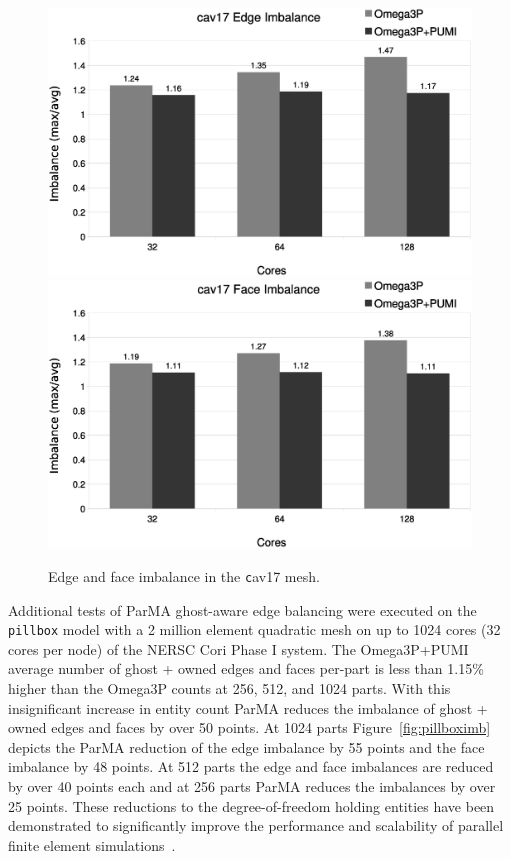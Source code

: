 \documentclass[review,12pt]{elsarticle_summary_report}
\begin{document}
\begin{figure}[ht]
\centering
  \includegraphics[width=\textwidth]{cav17-edge-imb.eps} \\
  \includegraphics[width=\textwidth]{cav17-face-imb.eps} \\
  \caption{\label{fig:cav17imb} Edge and face imbalance in the {\texttt cav17} mesh.}
\end{figure}

Additional tests of ParMA ghost-aware edge balancing were executed on the
\texttt{pillbox} model with a 2 million element quadratic mesh on up to 1024
cores (32 cores per node) of the NERSC Cori Phase I system.
The Omega3P+PUMI average number of ghost + owned edges and faces per-part
is less than 1.15\% higher than the Omega3P counts at 256, 512, and 1024 parts.
With this insignificant increase in entity count ParMA reduces the imbalance of 
ghost + owned edges and faces by over 50 points.
At 1024 parts Figure~\ref{fig:pillboximb} depicts the ParMA reduction of the
edge imbalance by 55 points and the face imbalance by 48 points.
At 512 parts the edge and face imbalances are reduced by over 40 points each and
at 256 parts ParMA reduces the imbalances by over 25 points.
These reductions to the degree-of-freedom holding entities have been
demonstrated to significantly improve the performance and scalability of
parallel finite element simulations~\cite{zhou2012unstructured,rasquinCise2014}.
\end{document}
